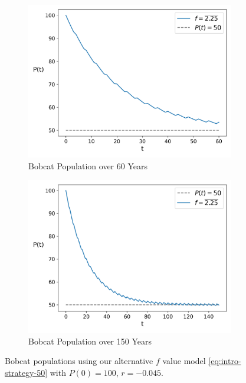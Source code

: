 \documentclass{article}
\begin{document}
\begin{figure}[h]
    \centering
    \begin{subfigure}{.5\textwidth}
        \centering
        \includegraphics[width=.95\linewidth]{./introduction_strategy/50_short_term.png}
        \caption{Bobcat Population over 60 Years}
        \label{fig:intro-strategy-50-short-term}
    \end{subfigure}%
    \begin{subfigure}{.5\textwidth}
        \centering
        \includegraphics[width=.95\linewidth]{./introduction_strategy/50_long_term.png}
        \caption{Bobcat Population over 150 Years}
        \label{fig:intro-strategy-50-long-term}
    \end{subfigure}
    \caption{Bobcat populations using our alternative $f$ value model \cref{eq:intro-strategy-50} with $P(0) = 100$, $r = -0.045$.}
    \label{fig:8}
\end{figure}
\end{document}
